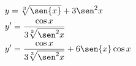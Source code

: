 \begin{ex}
\begin{align}
&y=\sqrt[3]{\sen{x}}+3\sen^2{x}\nonumber\\
&y'=\frac{\cos{x}}{3\sqrt[3]{\sen^2{x}}}\nonumber\\
&y'=\frac{\cos{x}}{3\sqrt[3]{\sen^2{x}}}+6\sen{x}\cos{x}\nonumber
\end{align}
\end{ex}